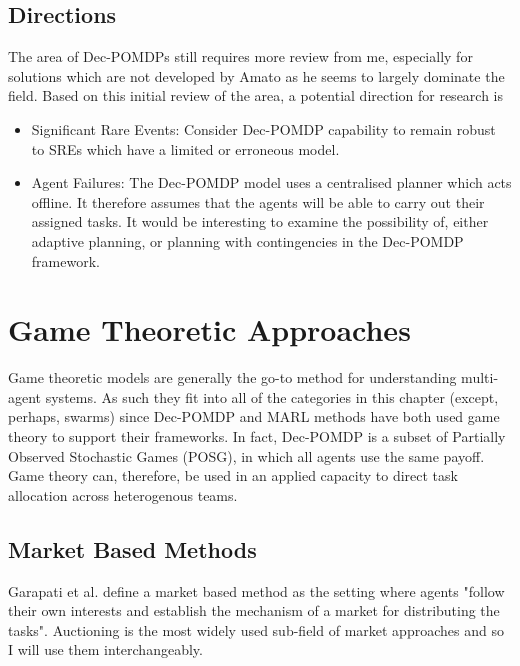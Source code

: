 \documentclass[preprint,11pt]{report}
\begin{document}
\subsection{Directions}

The area of Dec-POMDPs still requires more review from me, especially for solutions which are not
developed by Amato as he seems to largely dominate the field. Based on this initial review of the
area, a potential direction for research is

\begin{itemize} \item Significant Rare Events: Consider Dec-POMDP capability to remain robust to
SREs which have a limited or erroneous model. \item Agent Failures: The Dec-POMDP model uses a
centralised planner which acts offline. It therefore assumes that the agents will be able to carry
out their assigned tasks. It would be interesting to examine the possibility of, either adaptive
planning, or planning with contingencies in the Dec-POMDP framework. \end{itemize}

\section{Game Theoretic Approaches}

Game theoretic models are generally the go-to method for understanding multi-agent systems. As such
they fit into all of the categories in this chapter (except, perhaps, swarms) since Dec-POMDP and
MARL methods have both used game theory to support their frameworks. In fact, Dec-POMDP is a subset
of Partially Observed Stochastic Games (POSG), in which all agents use the same payoff. Game theory
can, therefore, be used in an applied capacity to direct task allocation across heterogenous teams.

\subsection{Market Based Methods}

Garapati et al. \cite{Garapati2018AMissions} define a market based method as the setting where
agents "follow their own interests and establish the mechanism of a market for distributing the
tasks". Auctioning is the most widely used sub-field of market approaches and so I will use them
interchangeably. 
\end{document}
